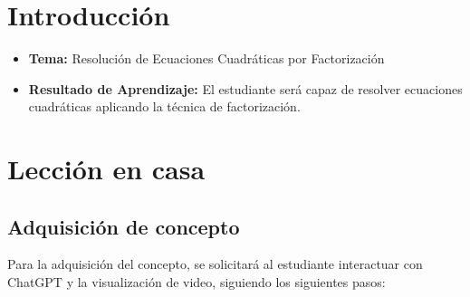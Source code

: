 \documentclass[a4,11pt]{aleph-notas}
\begin{document}
 

\encabezado

\section*{Introducción}

\begin{itemize}
    \item \textbf{Tema:} Resolución de Ecuaciones Cuadráticas por Factorización
    \item \textbf{Resultado de Aprendizaje:} El estudiante será capaz de resolver ecuaciones cuadráticas aplicando la técnica de factorización.
\end{itemize}

\section{Lección en casa}

\subsection{Adquisición de concepto}

Para la adquisición del concepto, se solicitará al estudiante interactuar con ChatGPT y la visualización de video, siguiendo los siguientes pasos:
\end{document}
